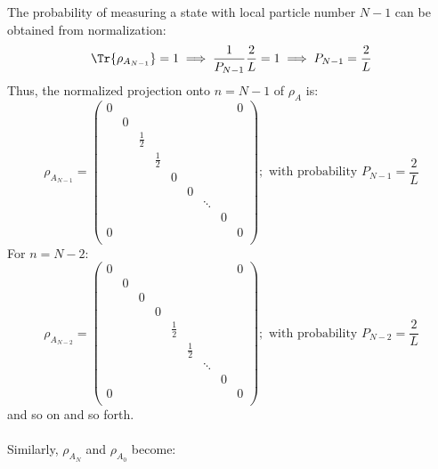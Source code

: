%
The probability of measuring a state with local particle number $N-1$ can be obtained from normalization:
%
\begin{equation}
\Tr{\rho_{A_{N-1}}} = 1 \implies \frac{1}{P_{N-1}}\frac{2}{L} = 1 \implies P_{N-1} = \frac{2}{L}
\end{equation}
%
Thus, the normalized projection onto $n=N-1$ of $\rho_{A}$ is:
%
\begin{equation}
\rho_{A_{N-1}} = \begin{pmatrix} 
0 & & & & & & & & 0 \\
& 0 \\
& & \frac{1}{2} \\
& & & \frac{1}{2} \\
& & & &  0 \\
& & & & & 0 \\
& & & & &  & \ddots \\
& & & & & & &  0 \\
0 & & & & & & & &  0 \\
\end{pmatrix} ; \text{ with probability } P_{N-1} = \frac{2}{L}
\end{equation}
%
For $n = N-2$:
%
\begin{equation}
 \rho_{A_{N-2}} = \begin{pmatrix} 
0 & & & & & & & & 0 \\
& 0 \\
& & 0  \\
& & & 0 \\
& & & &  \frac{1}{2} \\
& & & & & \frac{1}{2} \\
& & & & &  & \ddots \\
& & & & & & &  0 \\
0 & & & & & & & &  0 \\
\end{pmatrix} ; \text{ with probability } P_{N-2} = \frac{2}{L}
\end{equation}
%
and so on and so forth. \\
\\
Similarly, $\rho_{A_N}$ and $\rho_{A_0}$ become:
%
